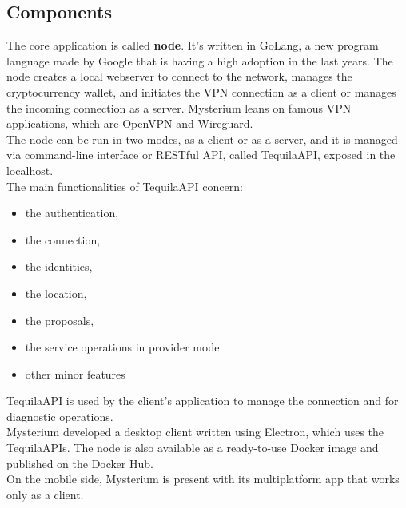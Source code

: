 \documentclass[12pt]{article}
\begin{document}
	\subsection{Components}
	The core application is called \textbf{node}. It's written in GoLang, a new program language made by Google that is having a high adoption in the last years. The node creates a local webserver to connect to the network, manages the cryptocurrency wallet, and initiates the VPN connection as a client or manages the incoming connection as a server. Mysterium leans on famous VPN applications, which are OpenVPN and Wireguard.\\
	The node can be run in two modes, as a client or as a server, and it is managed via command-line interface or RESTful API, called TequilaAPI, exposed in the localhost.\\
	\bigbreak
	The main functionalities of TequilaAPI concern:
	\begin{itemize}
		\item the authentication,
		\item the connection,
		\item the identities,
		\item the location,
		\item the proposals,
		\item the service operations in provider mode
		\item other minor features
	\end{itemize}
	\bigbreak

	TequilaAPI is used by the client's application to manage the connection and for diagnostic operations.\\
	Mysterium developed a desktop client written using Electron, which uses the TequilaAPIs. The node is also available as a ready-to-use Docker image and published on the Docker Hub.\\
	On the mobile side, Mysterium is present with its multiplatform app that works only as a client.\\
	
	\bigbreak
\end{document}
